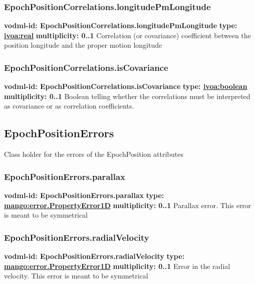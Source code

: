     \subsubsection{EpochPositionCorrelations.longitudePmLongitude}
      \textbf{vodml-id: EpochPositionCorrelations.longitudePmLongitude} \newline
      \textbf{type: \hyperref[sect:ivoa]{ivoa:real}} \newline
      \textbf{multiplicity: 0..1} \newline 
      Correlation (or covariance) coefficient between the position longitude and the proper motion longitude

    \subsubsection{EpochPositionCorrelations.isCovariance}
      \textbf{vodml-id: EpochPositionCorrelations.isCovariance} \newline
      \textbf{type: \hyperref[sect:ivoa]{ivoa:boolean}} \newline
      \textbf{multiplicity: 0..1} \newline 
      Boolean telling whether the correlations must be interpreted as covariance or as correlation coefficients.

  \subsection{EpochPositionErrors}
  \label{sect:EpochPositionErrors}
    Class holder for the errors of the EpochPosition attributes

    \subsubsection{EpochPositionErrors.parallax}
      \textbf{vodml-id: EpochPositionErrors.parallax} \newline
      \textbf{type: \hyperref[sect:error.PropertyError1D]{mango:error.PropertyError1D}} \newline
      \textbf{multiplicity: 0..1} \newline 
      Parallax error. This error is meant to be symmetrical

    \subsubsection{EpochPositionErrors.radialVelocity}
      \textbf{vodml-id: EpochPositionErrors.radialVelocity} \newline
      \textbf{type: \hyperref[sect:error.PropertyError1D]{mango:error.PropertyError1D}} \newline
      \textbf{multiplicity: 0..1} \newline 
      Error in the radial velocity. This error is meant to be symmetrical

